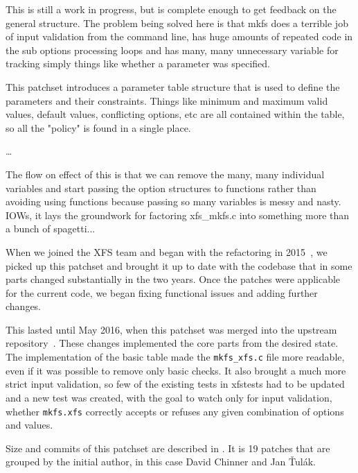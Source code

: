 \begin{desciption}
\begin{displayquote}
This is still a work in progress, but is complete enough to get
feedback on the general structure. The problem being solved here is
that mkfs does a terrible job of input validation from the command
line, has huge amounts of repeated code in the sub options
processing loops and has many, many unnecessary variable for
tracking simply things like whether a parameter was specified.

This patchset introduces a parameter table structure that is used to
define the parameters and their constraints. Things like minimum and
maximum valid values, default values, conflicting options, etc are
all contained within the table, so all the "policy" is found in a
single place.

\ldots

The flow on effect of this is that we can remove the many, many
individual variables and start passing the option structures to
functions rather than avoiding using functions because passing so
many variables is messy and nasty. IOWs, it lays the groundwork for
factoring xfs\_mkfs.c into something more than a bunch of spagetti...
\end{displayquote}

When we joined the XFS team and began with the refactoring in
2015~\cite{myFirstPatches}, we picked up this patchset and brought it up to
date with the codebase that in some parts changed substantially in the two
years. Once the patches were applicable for the current code, we began
fixing functional issues and adding further changes.


This lasted until May 2016, when this patchset was merged into the upstream
repository~\cite{finalPatchset1,finalPatchset1Announce}.
These changes implemented the core parts from the desired state. The
implementation of the basic table made the {\tt mkfs\_xfs.c} file more
readable, even if it was possible to remove only basic checks. It also
brought a much more strict input validation, so few of the existing tests
in xfstests had to be updated and a new test was created, with the goal to
watch only for input validation, whether {\tt mkfs.xfs} correctly accepts
or refuses any given combination of options and values.

Size and commits of this patchset are described in
. It is 19 patches that are
grouped by the initial author, in this case David Chinner and Jan Ťulák.


\end{desciption}
